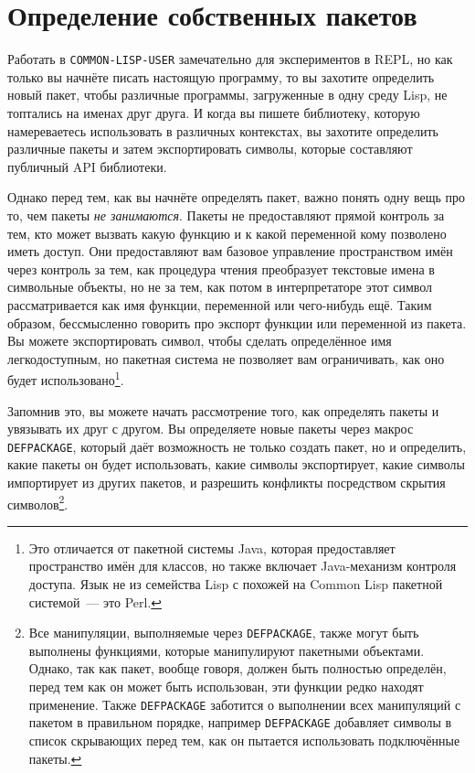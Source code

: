 \section{Определение собственных пакетов}

Работать в \lstinline{COMMON-LISP-USER} замечательно для экспериментов в REPL, но как только вы
начнёте писать настоящую программу, то вы захотите определить новый пакет, чтобы различные
программы, загруженные в одну среду Lisp, не топтались на именах друг друга. И когда вы
пишете библиотеку, которую намереваетесь использовать в различных контекстах, вы захотите
определить различные пакеты и затем экспортировать символы, которые составляют публичный
API библиотеки.

Однако перед тем, как вы начнёте определять пакет, важно понять одну вещь про то, чем
пакеты \textit{не занимаются}. Пакеты не предоставляют прямой контроль за тем, кто может
вызвать какую функцию и к какой переменной кому позволено иметь доступ. Они предоставляют
вам базовое управление пространством имён через контроль за тем, как процедура чтения
преобразует текстовые имена в символьные объекты, но не за тем, как потом в интерпретаторе
этот символ рассматривается как имя функции, переменной или чего-нибудь ещё. Таким
образом, бессмысленно говорить про экспорт функции или переменной из пакета. Вы можете
экспортировать символ, чтобы сделать определённое имя легкодоступным, но пакетная система
не позволяет вам ограничивать, как оно будет использовано\footnote{Это отличается от
  пакетной системы Java, которая предоставляет пространство имён для классов, но также
  включает Java-механизм контроля доступа. Язык не из семейства Lisp с похожей на Common
  Lisp пакетной системой~--- это Perl.}.

Запомнив это, вы можете начать рассмотрение того, как определять пакеты и увязывать их
друг с другом.  Вы определяете новые пакеты через макрос \lstinline{DEFPACKAGE}, который даёт
возможность не только создать пакет, но и определить, какие пакеты он будет использовать,
какие символы экспортирует, какие символы импортирует из других пакетов, и разрешить
конфликты посредством скрытия символов\footnote{Все манипуляции, выполняемые через
    \lstinline{DEFPACKAGE}, также могут быть выполнены функциями, которые манипулируют
    пакетными объектами. Однако, так как пакет, вообще говоря, должен быть полностью
    определён, перед тем как он может быть использован, эти функции редко находят
    применение. Также \lstinline{DEFPACKAGE} заботится о выполнении всех манипуляций с пакетом
    в правильном порядке, например \lstinline{DEFPACKAGE} добавляет символы в список
    скрывающих перед тем, как он пытается использовать подключённые пакеты.}.

